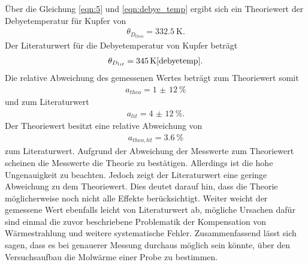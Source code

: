Über die Gleichung \eqref{eqn:5} und \eqref{eqn:debye_temp}
ergibt sich ein Theoriewert der Debyetemperatur für Kupfer von
\begin{align}
\theta_{D_{theo}} = \SI{332.5}{\kelvin}.
\end{align}
Der Literaturwert für die Debyetemperatur von
Kupfer beträgt
\begin{align}
\theta_{D_{lit}} = \SI{345}{\kelvin} \text{\cite{debyetemp}.}
\end{align}
Die relative Abweichung des gemessenen Wertes beträgt zum Theoriewert somit
\begin{align}
a_{theo} = \SI{1(12)}{\percent}
\end{align}
und zum Literaturwert
\begin{align}
a_{lit}= \SI{4(12)}{\percent}.
\end{align}
Der Theoriewert besitzt eine relative Abweichung von
\begin{align}
a_{theo,lit}=\SI{3.6}{\percent}
\end{align}
zum Literaturwert.
Aufgrund der Abweichung der Messwerte zum Theoriewert
scheinen die Messwerte die Theorie zu bestätigen. Allerdings
ist die hohe Ungenauigkeit zu beachten. Jedoch zeigt
der Literaturwert eine geringe Abweichung zu dem Theoriewert.
Dies deutet darauf hin, dass die Theorie möglicherweise noch nicht alle
Effekte berücksichtigt. Weiter weicht der gemessene Wert ebenfalls leicht von Literaturwert ab,
mögliche Ursachen dafür sind einmal die zuvor beschriebene Problematik der Kompensation von Wärmestrahlung
und weitere systematische Fehler.
Zusammenfassend lässt sich sagen, dass es bei genauerer Messung
durchaus möglich sein könnte, über den Versuchsaufbau
die Molwärme einer Probe zu bestimmen.
